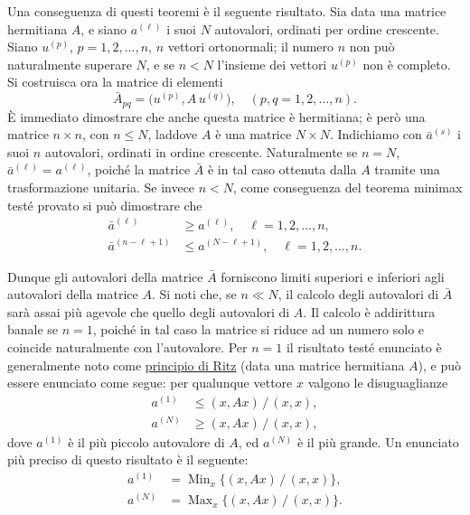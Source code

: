 \documentclass[11pt, a4paper]{book}
\numberwithin{equation}{section}
\begin{document}
Una conseguenza di questi teoremi è il seguente risultato. Sia data una
matrice hermitiana $A$, e siano $a^{(\ell)}$ i suoi $N$ autovalori,
ordinati per ordine crescente. Siano $u^{(p)}$, $p = 1, 2, \ldots, n$, $n$
vettori ortonormali; il numero $n$ non può naturalmente superare $N$, e se
$n < N$ l'insieme dei vettori $u^{(p)}$ non è completo. Si costruisca ora
la matrice di elementi
\[
\bar{A}_{pq} = \bigl(u^{(p)}, A\,u^{(q)}\bigr), \quad (p,q = 1,2,\ldots,n).
\]
È immediato dimostrare che anche questa matrice è hermitiana; è però una
matrice $n \times n$, con $n \leq N$, laddove $A$ è una matrice $N \times
N$. Indichiamo con $\bar{a}^{(s)}$ i suoi $n$ autovalori, ordinati in
ordine crescente. Naturalmente se $n = N$, $\bar{a}^{(\ell)} = a^{(\ell)}$,
poiché la matrice $\bar{A}$ è in tal caso ottenuta dalla $A$ tramite una
trasformazione unitaria. Se invece $n < N$, come conseguenza del teorema
minimax testé provato si può dimostrare che
\begin{align}
\bar{a}^{(\ell)} &\geq a^{(\ell)}, \quad \ell = 1,2,\ldots,n, \tag{19a} \\
\bar{a}^{(n-\ell+1)} &\leq a^{(N-\ell+1)}, \quad \ell = 1,2,\ldots,n. \tag{19b}
\end{align}


Dunque gli autovalori della matrice $\bar{A}$ forniscono limiti superiori e
inferiori agli autovalori della matrice $A$. Si noti che, se $n \ll N$, il
calcolo degli autovalori di $\bar{A}$ sarà assai più agevole che quello
degli autovalori di $A$. Il calcolo è addirittura banale se $n = 1$, poiché
in tal caso la matrice si riduce ad un numero solo e coincide naturalmente
con l'autovalore. Per $n=1$ il risultato testé enunciato è generalmente
noto come \underline{principio di Ritz} (data una matrice hermitiana $A$),
e può essere enunciato come segue: per qualunque vettore $x$ valgono le
disuguaglianze
\begin{align}
a^{(1)} &\leq (x, Ax)\,/\,(x,x), \tag{20a} \\
a^{(N)} &\geq (x, Ax)\,/\,(x,x), \tag{20b}
\end{align}
dove $a^{(1)}$ è il più piccolo autovalore di $A$, ed $a^{(N)}$ è il più
grande. Un enunciato più preciso di questo risultato è il seguente:
\begin{align}
a^{(1)} &= \operatorname{Min}_x\bigl\{(x,Ax)\,/\,(x,x)\bigr\}, \tag{21a} \\
a^{(N)} &= \operatorname{Max}_x\bigl\{(x,Ax)\,/\,(x,x)\bigr\}. \tag{21b}
\end{align}
\end{document}

